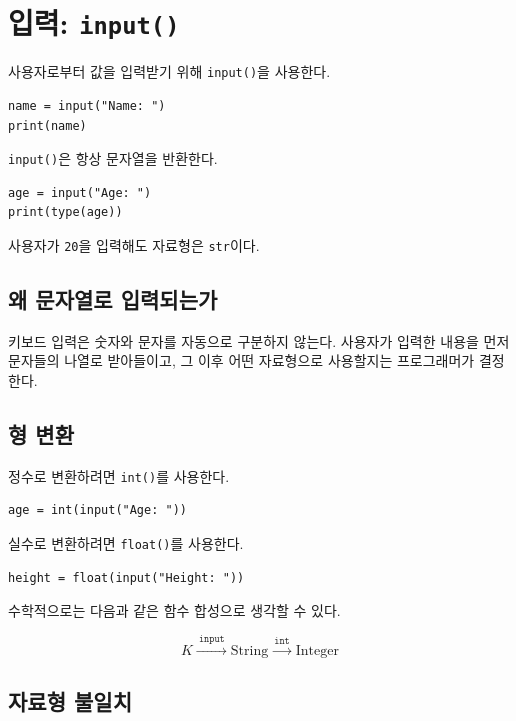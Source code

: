 \documentclass[11pt,a4paper]{article}
\begin{document}
\section{입력: \texttt{input()}}

사용자로부터 값을 입력받기 위해 \texttt{input()}을 사용한다.

\begin{lstlisting}
name = input("Name: ")
print(name)
\end{lstlisting}

\texttt{input()}은 항상 문자열을 반환한다.

\begin{lstlisting}
age = input("Age: ")
print(type(age))
\end{lstlisting}

사용자가 \texttt{20}을 입력해도 자료형은 \texttt{str}이다.

\subsection{왜 문자열로 입력되는가}

키보드 입력은 숫자와 문자를 자동으로 구분하지 않는다.
사용자가 입력한 내용을 먼저 문자들의 나열로 받아들이고,
그 이후 어떤 자료형으로 사용할지는 프로그래머가 결정한다.

\subsection{형 변환}

정수로 변환하려면 \texttt{int()}를 사용한다.

\begin{lstlisting}
age = int(input("Age: "))
\end{lstlisting}

실수로 변환하려면 \texttt{float()}를 사용한다.

\begin{lstlisting}
height = float(input("Height: "))
\end{lstlisting}

수학적으로는 다음과 같은 함수 합성으로 생각할 수 있다.

\[
K
\xrightarrow{\ \texttt{input}\ }
\mathrm{String}
\xrightarrow{\ \texttt{int}\ }
\mathrm{Integer}
\]

\subsection{자료형 불일치}
\end{document}
